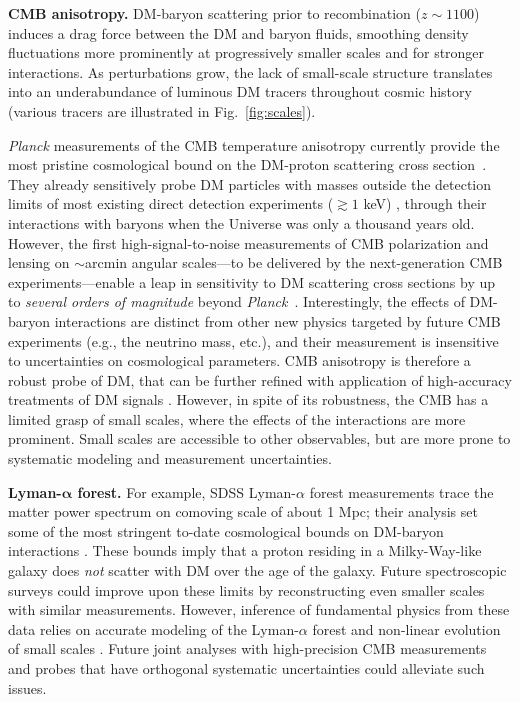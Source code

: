 \documentclass[12pt]{article}
\begin{document}
\textbf{CMB anisotropy.} 
DM-baryon scattering prior to recombination ($z\sim 1100$) induces a drag force between the DM and baryon fluids, smoothing density fluctuations more prominently at progressively smaller scales and for stronger interactions.
As perturbations grow, the lack of small-scale structure translates into an underabundance of luminous DM tracers throughout cosmic history (various tracers are illustrated in Fig.~\ref{fig:scales}).

\textit{Planck} measurements of the CMB temperature anisotropy currently provide the most pristine cosmological bound on the DM-proton scattering cross section~\cite{Boddy:2018kfv,Gluscevic:2017ywp,Boddy:2018wzy,Xu:2018efh,Slatyer:2018aqg,Dvorkin:2013cea}.
They already sensitively probe DM particles with masses outside the detection limits of most existing direct detection experiments ($\gtrsim 1$ keV) \cite{Gluscevic:2017ywp}, through their interactions with baryons when the Universe was only a thousand years old.
However, the first high-signal-to-noise measurements of CMB polarization and lensing on $\sim$arcmin angular scales---to be delivered by the next-generation CMB experiments---enable a leap in sensitivity to DM scattering cross sections by up to \textit{several orders of magnitude} beyond \textit{Planck}~\cite{2018PhRvD..98l3524L,2019JCAP...02..056A,Abazajian:2016yjj,2019arXiv190210541H}.
Interestingly, the effects of DM-baryon interactions are distinct from other new physics targeted by future CMB experiments (e.g., the neutrino mass, etc.), and their measurement is insensitive to uncertainties on cosmological parameters.
CMB anisotropy is therefore a robust probe of DM, that can be further refined with application of high-accuracy treatments of DM signals \cite{AliHaimoud_19}.
However, in spite of its robustness, the CMB has a limited grasp of small scales, where the effects of the interactions are more prominent. 
Small scales are accessible to other observables, but are more prone to systematic modeling and measurement uncertainties.

\textbf{Lyman-${\boldsymbol\alpha}$ forest.} 
For example, SDSS Lyman-$\alpha$ forest measurements trace the matter power spectrum on comoving scale of about 1 Mpc; their analysis set some of the most stringent to-date cosmological bounds on DM-baryon interactions \cite{Xu:2018efh,Dvorkin:2013cga}.
These bounds imply that a proton residing in a Milky-Way-like galaxy does \textit{not} scatter with DM over the age of the galaxy.
Future spectroscopic surveys could improve upon these limits by reconstructing even smaller scales with similar measurements.
However, inference of fundamental physics from these data relies on accurate modeling of the Lyman-$\alpha$ forest and non-linear evolution of small scales \cite{2017PhRvD..96b3522I}.
Future joint analyses with high-precision CMB measurements and probes that have orthogonal systematic uncertainties could alleviate such issues.
\end{document}
